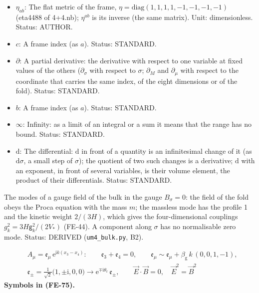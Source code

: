 \documentclass[
  10pt,
]{article}
\begin{document}
\begin{itemize}
  the two states of a resonance, \(m_2^2 - m_1^2\), multiplied by
  \(v_{\mathrm{loc}}^2/v^2\) where this differs from 1; \(m\) without a
  label the mass of a mode of a field of the bulk as the fold sees it,
  \(m^2 = \omega^2 - k^2\); for the W and Z bosons their complex pole
  mass, \(m^2 = m_0^2 - \mathrm{i}m_0\Gamma_{\mathrm{bulk}}\) to the
  leading order; in the relic abundance of the particles \(\chi\) their
  mass. Unit: GeV. Status: STANDARD.
\item
  \(\eta_{ab}\): The flat metric of the frame,
  \(\eta = \mathrm{diag}(1, 1, 1, 1, -1, -1, -1, -1)\) (eta4488 of
  4+4.nb); \(\eta^{ab}\) is its inverse (the same matrix). Unit:
  dimensionless. Status: AUTHOR.
\item
  \(c\): A frame index (as \(a\)). Status: STANDARD.
\item
  \(\partial\): A partial derivative: the derivative with respect to one
  variable at fixed values of the others (\(\partial_\sigma\) with
  respect to \(\sigma\); \(\partial_M\) and \(\partial_\mu\) with
  respect to the coordinate that carries the same index, of the eight
  dimensions or of the fold). Status: STANDARD.
\item
  \(b\): A frame index (as \(a\)). Status: STANDARD.
\item
  \(\infty\): Infinity: as a limit of an integral or a sum it means that
  the range has no bound. Status: STANDARD.
\item
  \(\mathrm{d}\): The differential: \(\mathrm{d}\) in front of a
  quantity is an infinitesimal change of it (as \(\mathrm{d}\sigma\), a
  small step of \(\sigma\)); the quotient of two such changes is a
  derivative; \(\mathrm{d}\) with an exponent, in front of several
  variables, is their volume element, the product of their
  differentials. Status: STANDARD.
\end{itemize}

The modes of a gauge field of the bulk in the gauge \(B_\sigma = 0\):
the field of the fold obeys the Proca equation with the mass \(m\); the
massless mode has the profile 1 and the kinetic weight \(2/(3H)\), which
gives the four-dimensional couplings \(g_k^2 = 3H\mathsf{g}_k^2/(2V_*)\)
(FE-44). A component along \(\sigma\) has no normalisable zero mode.
Status: DERIVED (\texttt{um4\_bulk.py}, B2).

\[
\begin{aligned}
&A_\mu = \mathfrak{e}_\mu\,\mathrm{e}^{\mathrm{i}k(x_3 - x_4)}:\qquad \mathfrak{e}_3 + \mathfrak{e}_4 = 0,\qquad
\mathfrak{e}_\mu \sim \mathfrak{e}_\mu + \beta_{\mathrm{g}}\,k\,(0, 0, 1, -1),\\
&\mathfrak{e}_\pm = \frac{1}{\sqrt2}\big(1, \pm\mathrm{i}, 0, 0\big) \to \mathrm{e}^{\mp\mathrm{i}\theta_{\mathrm{r}}}\,\mathfrak{e}_\pm,\qquad
\vec E\cdot\vec B = 0,\quad \vec E^2 = \vec B^2
\end{aligned} \tag{FE-75}
\] \textbf{Symbols in (FE-75).}
\end{document}
